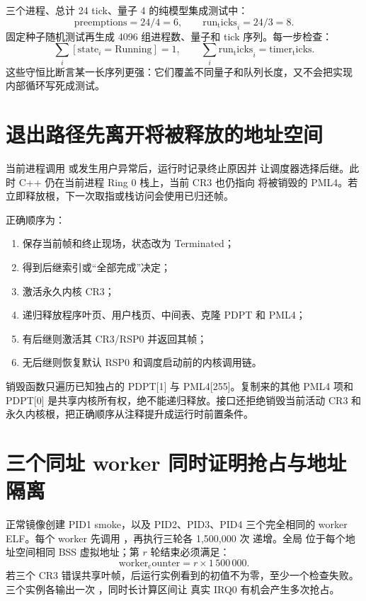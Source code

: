 三个进程、总计 24 tick、量子 4 的纯模型集成测试中：
\[
  \mathrm{preemptions}=24/4=6,\qquad
  \mathrm{run_ticks}_i=24/3=8.
\]
固定种子随机测试再生成 4096 组进程数、量子和 tick 序列。每一步检查：
\[
  \sum_i [\mathrm{state}_i=\mathrm{Running}] = 1,\qquad
  \sum_i \mathrm{run_ticks}_i = \mathrm{timer_ticks}.
\]
这些守恒比断言某一长序列更强：它们覆盖不同量子和队列长度，又不会把实现
内部循环写死成测试。

\section{退出路径先离开将被释放的地址空间}

当前进程调用  或发生用户异常后，运行时记录终止原因并
让调度器选择后继。此时 C++ 仍在当前进程 Ring 0 栈上，当前 CR3 也仍指向
将被销毁的 PML4。若立即释放根，下一次取指或栈访问会使用已归还帧。

正确顺序为：

\begin{enumerate}[label=\arabic*.]
  \item 保存当前帧和终止现场，状态改为 Terminated；
  \item 得到后继索引或“全部完成”决定；
  \item 激活永久内核 CR3；
  \item 递归释放程序叶页、用户栈页、中间表、克隆 PDPT 和 PML4；
  \item 有后继则激活其 CR3/RSP0 并返回其帧；
  \item 无后继则恢复默认 RSP0 和调度启动前的内核调用链。
\end{enumerate}

销毁函数只遍历已知独占的 PDPT[1] 与 PML4[255]。复制来的其他 PML4 项和
PDPT[0] 是共享内核所有权，绝不能递归释放。接口还拒绝销毁当前活动 CR3 和
永久内核根，把正确顺序从注释提升成运行时前置条件。

\section{三个同址 worker 同时证明抢占与地址隔离}

正常镜像创建 PID1 smoke，以及 PID2、PID3、PID4 三个完全相同的 worker
ELF。每个 worker 先调用 ，再执行三轮各 1,500,000 次
递增。全局  位于每个地址空间相同 BSS 虚拟地址；第
\(r\) 轮结束必须满足：
\[
  \mathrm{worker_counter}=r\times1\,500\,000.
\]
若三个 CR3 错误共享叶帧，后运行实例看到的初值不为零，至少一个检查失败。
三个实例各输出一次 ，同时长计算区间让
真实 IRQ0 有机会产生多次抢占。

